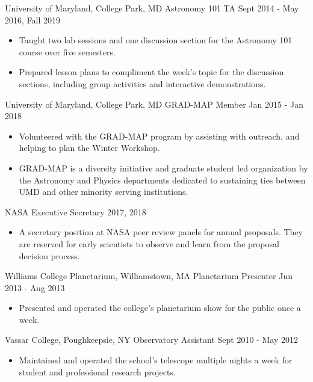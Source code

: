 \documentclass[]{awesome-cv}
\begin{document}
\begin{cventries}
	\cventry
	{University of Maryland, College Park, MD}
	{Astronomy 101 TA}
	{Sept 2014 - May 2016, Fall 2019}
	{}
	{\vspace{-3mm}
		\begin{itemize}
		\item Taught two lab sessions and one discussion section for the Astronomy 101 course over five semesters. 
		\item Prepared lesson plans to compliment the week's topic for the discussion sections, including group activities and interactive demonstrations.
		\end{itemize}
	}
	
	\vspace{-6mm}
	\cventry
	{University of Maryland, College Park, MD}
	{GRAD-MAP Member}
	{Jan 2015 - Jan 2018}
	{}
	{\vspace{-3mm}
		\begin{itemize}
			\item Volunteered with the GRAD-MAP program by assisting with outreach, and helping to plan the Winter Workshop. 
			\item GRAD-MAP is a diversity initiative and graduate student led organization by the Astronomy and Physics departments dedicated to sustaining ties between UMD and other minority serving institutions.
		\end{itemize}
	}
	
	\vspace{-6mm}
	\cventry
	{NASA}
	{Executive Secretary}
	{2017, 2018}
	{}
	{\vspace{-3mm}
		\begin{itemize}
			\item A secretary position at NASA peer review panels for annual proposals. They are reserved for early scientists to observe and learn from the proposal decision process.
		\end{itemize}
	}
	
	\vspace{-6mm}
	\cventry
	{Williams College Planetarium, Williamstown, MA}
	{Planetarium Presenter}
	{Jun 2013 - Aug 2013}
	{}
	{\vspace{-3mm}
		\begin{itemize}
			\item Presented and operated the college's planetarium show for the public once a week.
		\end{itemize}
	}
	
	\vspace{-6mm}
	\cventry
	{Vassar College, Poughkeepsie, NY}
	{Observatory Assistant}
	{Sept 2010 - May 2012}
	{}
	{\vspace{-3mm}
		\begin{itemize}
			\item Maintained and operated the school's telescope multiple nights a week for student and professional research projects. 
		\end{itemize}
	}

	\vspace{-5mm}
\end{cventries}
\end{document}
